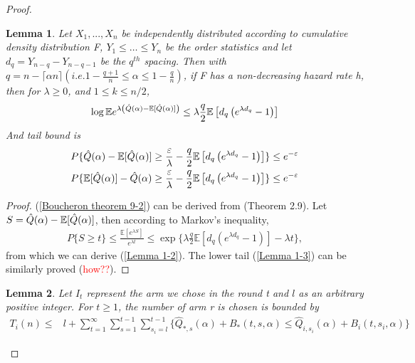 \documentclass{article}
\theoremstyle{plain}
\newtheorem{lemma}{Lemma}
\begin{document}
\begin{proof}

\begin{lemma}
Let $X_1,..., X_n$ be independently distributed according to cumulative density distribution F, $Y_{1} \leq \ldots \leq Y_{n}$ be the order statistics and let $d_q = Y_{n-q} - Y_{n-q-1}$ be the $q^{th}$ spacing. Then with $q = n - \lceil \alpha n \rceil (i.e. 1 - \frac{q+1}{n} \leq \alpha \leq 1 - \frac{q}{n})$, if F has a non-decreasing hazard rate h, then for $\lambda \geq 0$, and $1\leq k \leq n/2$,
\begin{align}
    \label{Boucheron theorem 9-2}
    \log \mathbb{E}e^{\lambda\left(\Hat{Q}(\alpha)-\mathbb{E}[ \Hat{Q}(\alpha)]\right)} \leq \lambda \frac{q}{2} \mathbb{E}\left[d_q\left(e^{\lambda d_q}-1\right)\right]
\end{align}
And tail bound is 
\begin{align}
    \label{Lemma 1-2}
   P\{\Hat{Q}(\alpha)-\mathbb{E}[ \Hat{Q}(\alpha)] \geq \frac{\varepsilon}{\lambda} - \frac{q}{2} \mathbb{E}\left[d_q\left(e^{\lambda d_q}-1\right)\right]\} \leq e^{-\varepsilon}\\
   \label{Lemma 1-3}
   P\{\mathbb{E}[ \Hat{Q}(\alpha)] - \Hat{Q}(\alpha) \geq \frac{\varepsilon}{\lambda} - \frac{q}{2} \mathbb{E}\left[d_q\left(e^{\lambda d_q}-1\right)\right]\} \leq e^{-\varepsilon}
\end{align}
\end{lemma}

\begin{proof}
(\ref{Boucheron theorem 9-2}) can be derived from \cite{boucheron2012}(Theorem 2.9).  Let $S = \Hat{Q}(\alpha)-\mathbb{E}[ \Hat{Q}(\alpha)]$, then according to Markov's inequality,
\begin{align}
    P \{S \geq t\} \leq \frac{\mathbb{E}[e^{\lambda S}]}{e^{\lambda t}} \leq \exp\{\lambda \frac{q}{2} \mathbb{E}\left[d_q\left(e^{\lambda d_q}-1\right)\right] - \lambda t\},
\end{align}
from which we can derive (\ref{Lemma 1-2}). The lower tail (\ref{Lemma 1-3}) can be similarly proved (\textcolor{red}{how??}).
\end{proof}

\begin{lemma}
Let $I_t$ represent the arm we chose in the round t and $l$ as an arbitrary positive integer. For $t \geq 1$, the number of arm r is chosen is bounded by
\begin{align}
    T_i(n) \leq & l + \sum_{t = 1}^\infty \sum_{s = 1}^{t-1} \sum_{s_i = l}^{t-1} \{\hat{Q}_{*, s}(\alpha) + B_*(t, s, \alpha)  \leq \hat{Q}_{i, s_i}(\alpha) + B_i(t, s_i, \alpha)\}
\end{align}
\end{lemma}
 

\end{proof}
\end{document}

